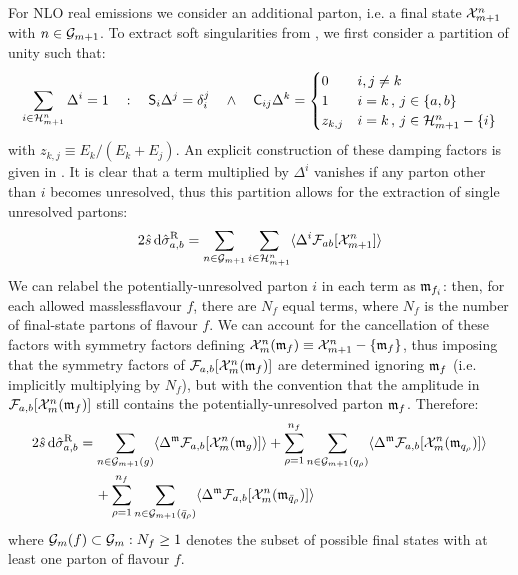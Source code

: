 For NLO real emissions we consider an additional parton, i.e. a final state $ \mathcal{X}^{n}_{m+1} $ with $ n \in \mathcal{G}_{m+1} $. To extract soft singularities from , we first consider a partition of unity such that:
\begin{equation}
  \sum_{i \in \mathcal{H}^{n}_{m+1}} \Delta^i = 1
  \quad : \quad
  \mathsf{S}_i \Delta^j = \delta_i^j
  \quad \land \quad
  \mathsf{C}_{ij} \Delta^k =
  \begin{cases}
    0 & i,j \neq k \\
    1 & i = k \,,\, j \in \{a,b\} \\
    z_{k,j} & i = k \,,\, j \in \mathcal{H}^{n}_{m+1} - \{i\}
  \end{cases}
  \label{eq:delta-part}
\end{equation}
with $ z_{k,j} \equiv E_k / (E_k + E_j) $. An explicit construction of these damping factors is given in . It is clear that a term multiplied by $ \Delta^i $ vanishes if any parton other than $ i $ becomes unresolved, thus this partition allows for the extraction of single unresolved partons:
\begin{equation*}
  2\hat{s}\, \mathrm{d}\hat{\sigma}_{a,b}^\text{R} = \sum_{n \in \mathcal{G}_{m+1}} \sum_{i \in \mathcal{H}^{n}_{m+1}} \langle \Delta^i \mathcal{F}_{ab}[\mathcal{X}^{n}_{m+1}] \rangle
\end{equation*}
We can relabel the potentially-unresolved parton $ i $ in each term as $ \mathfrak{m}_{f_i} $: then, for each allowed massless\footnotemark flavour $ f $, there are $ N_f $ equal terms, where $ N_f $ is the number of final-state partons of flavour $ f $. We can account for the cancellation of these factors with symmetry factors defining $ \mathcal{X}^{n}_{m}(\mathfrak{m}_f) \equiv \mathcal{X}^{n}_{m+1} - \{\mathfrak{m}_f\} $, thus imposing that the symmetry factors of $ \mathcal{F}_{a,b}[\mathcal{X}^{n}_{m}(\mathfrak{m}_f)] $ are determined ignoring $ \mathfrak{m}_f $ (i.e. implicitly multiplying by $ N_f $), but with the convention that the amplitude in $ \mathcal{F}_{a,b}[\mathcal{X}^{n}_{m}(\mathfrak{m}_f)] $ still contains the potentially-unresolved parton $ \mathfrak{m}_f $. Therefore:
\begin{equation}
  \begin{split}
    2\hat{s}\, \mathrm{d}\hat{\sigma}_{a,b}^\text{R}
    & = \sum_{n \in \mathcal{G}_{m+1}(g)} \langle \Delta^{\mathfrak{m}} \mathcal{F}_{a,b}[\mathcal{X}^{n}_{m}(\mathfrak{m}_g)] \rangle + \sum_{\rho = 1}^{n_f} \sum_{n \in \mathcal{G}_{m+1}(q_\rho)} \langle \Delta^{\mathfrak{m}} \mathcal{F}_{a,b}[\mathcal{X}^{n}_{m}(\mathfrak{m}_{q_\rho})] \rangle \\
    & \quad\, + \sum_{\rho = 1}^{n_f} \sum_{n \in \mathcal{G}_{m+1}(\bar{q}_\rho)} \langle \Delta^{\mathfrak{m}} \mathcal{F}_{a,b}[\mathcal{X}^{n}_{m}(\mathfrak{m}_{\bar{q}_\rho})] \rangle
  \end{split}
\end{equation}
where $ \mathcal{G}_m(f) \subset \mathcal{G}_m : N_f \ge 1 $ denotes the subset of possible final states with at least one parton of flavour $ f $.

